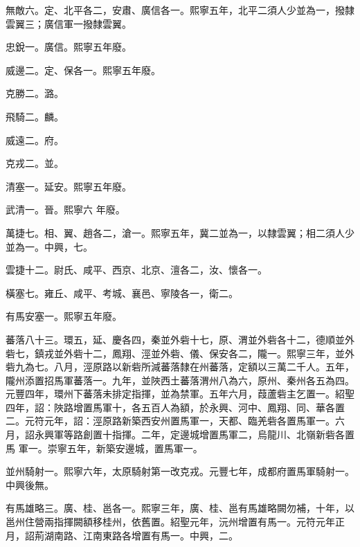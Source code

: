 \begin{pinyinscope}
 無敵六。定、北平各二，安肅、廣信各一。熙寧五年，北平二須人少並為一，撥隸雲翼三；廣信軍一撥隸雲翼。



 忠銳一。廣信。熙寧五年廢。



 威邊二。定、保各一。熙寧五年廢。



 克勝二。潞。



 飛騎二。麟。



 威遠二。府。



 克戎二。並。



 清塞一。延安。熙寧五年廢。



 武清一。晉。熙寧六
 年廢。



 萬捷七。相、翼、趙各二，滄一。熙寧五年，冀二並為一，以隸雲翼；相二須人少並為一。中興，七。



 雲捷十二。尉氏、咸平、西京、北京、澶各二，汝、懷各一。



 橫塞七。雍丘、咸平、考城、襄邑、寧陵各一，衛二。



 有馬安塞一。熙寧五年廢。



 蕃落八十三。環五，延、慶各四，秦並外砦十七，原、渭並外砦各十二，德順並外砦七，鎮戎並外砦十二，鳳翔、涇並外砦、儀、保安各二，隴一。熙寧三年，並外砦九為七。八月，涇原路以新砦所減蕃落隸在州蕃落，定額以三萬二千人。五年，隴州添置招馬軍蕃落一。九年，並陜西土蕃落渭州八為六，原州、秦州各五為四。元豐四年，環州下蕃落未排定指揮，並為禁軍。五年六月，葭蘆砦主乞置一。紹聖四年，詔：陜路增置馬軍十，各五百人為額，於永興、河中、鳳翔、同、華各置二。元符元年，詔：涇原路新築西安州置馬軍一，天都、臨羌砦各置馬軍一。六月，詔永興軍等路創置十指揮。二年，定邊城增置馬軍二，烏龍川、北嶺新砦各置馬
 軍一。崇寧五年，新築安邊城，置馬軍一。



 並州騎射一。熙寧六年，太原騎射第一改克戎。元豐七年，成都府置馬軍騎射一。中興後無。



 有馬雄略三。廣、桂、邕各一。熙寧三年，廣、桂、邕有馬雄略闕勿補，十年，以邕州住營兩指揮闕額移桂州，依舊置。紹聖元年，沅州增置有馬一。元符元年正月，詔荊湖南路、江南東路各增置有馬一。中興，二。




\end{pinyinscope}
